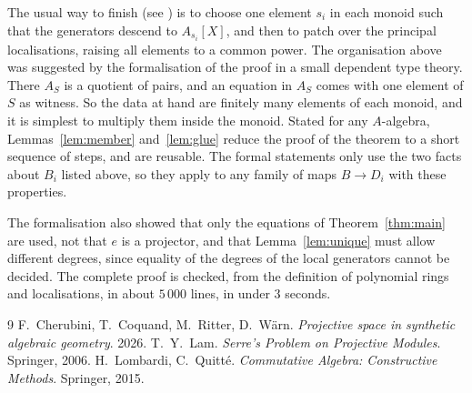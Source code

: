 \documentclass[11pt]{amsart}
\theoremstyle{remark}
\begin{document}
The usual way to finish (see \cite[Corollary 7.7]{Proj}) is to choose one element
$s_i$ in each monoid such that the generators descend to $A_{s_i}[X]$, and then
to patch over the principal localisations, raising all elements to a common
power. The organisation above was suggested by the formalisation of the proof in
a small dependent type theory. There $A_S$ is a quotient of pairs, and an
equation in $A_S$ comes with one element of $S$ as witness. So the data at hand
are finitely many elements of each monoid, and it is simplest to multiply them
inside the monoid. Stated for any $A$-algebra, Lemmas~\ref{lem:member}
and~\ref{lem:glue} reduce the proof of the theorem to a short sequence of
steps, and are reusable. The formal statements only use the two facts about $B_i$ listed above, so they
apply to any family of maps $B\to D_i$ with these properties.

The formalisation also showed that only the equations of
Theorem~\ref{thm:main} are used, not that $e$ is a projector, and that
Lemma~\ref{lem:unique} must allow different degrees, since equality of the
degrees of the local generators cannot be decided. The complete proof is
checked, from the definition of polynomial rings and localisations, in about
$5\,000$ lines, in under $3$ seconds.

\begin{thebibliography}{9}
 F.~Cherubini, T.~Coquand, M.~Ritter, D.~W\"arn.
\emph{Projective space in synthetic algebraic geometry}. 2026.
 T.~Y.~Lam. \emph{Serre's Problem on Projective Modules}.
Springer, 2006.
 H.~Lombardi, C.~Quitt\'e. \emph{Commutative Algebra:
Constructive Methods}. Springer, 2015.
\end{thebibliography}
\end{document}
